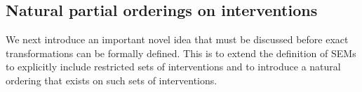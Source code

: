 %
%



\subsection{Natural partial orderings on interventions}

We next introduce an important novel idea that must be discussed before exact transformations can be formally defined.
This is to extend the definition of SEMs to explicitly include restricted sets of interventions and to introduce a natural ordering that exists on such sets of interventions.







